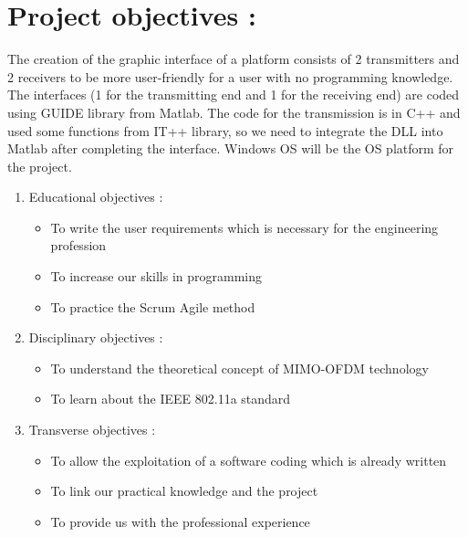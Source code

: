 \documentclass[12pt,a4paper]{article}
\begin{document}
\section{Project objectives :}
The creation of the graphic interface of a platform consists of 2 transmitters and 2 receivers to be more user-friendly for a user with no programming knowledge. The interfaces (1 for the transmitting end and 1 for the receiving end) are coded using GUIDE library from Matlab. The code for the transmission is in C++ and used some functions from IT++ library, so we need to integrate the DLL into Matlab after completing the interface. Windows OS will be the OS platform for the project.  
\begin{enumerate}
\item Educational objectives : 
\begin{itemize}
\item To write the user requirements which is necessary for the engineering profession 
\item To increase our skills in programming
\item To practice the Scrum Agile method 
\end{itemize}
\item Disciplinary objectives : 
\begin{itemize}
\item To understand the theoretical concept of MIMO-OFDM technology
\item To learn about the IEEE 802.11a standard
\end{itemize}
\item Transverse objectives : 
\begin{itemize}
\item To allow the exploitation of a software coding which is already written
\item To link our practical knowledge and the project
\item To provide us with the professional experience 
\end{itemize}
\end{enumerate}

\clearpage
\end{document}
